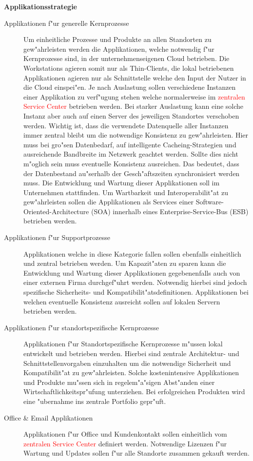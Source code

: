 \textbf{Applikationsstrategie}\\

\begin{description}
	
	\item[Applikationen f"ur generelle Kernprozesse] Um einheitliche Prozesse und Produkte an allen Standorten zu gew"ahrleisten werden die Applikationen, welche notwendig f"ur Kernprozesse sind, in der unternehmenseigenen Cloud betrieben. Die Workstations agieren somit nur als Thin-Clients, die lokal betriebenen Applikationen agieren nur als Schnittstelle welche den Input der Nutzer in die Cloud einspei"en. Je nach Auslastung sollen verschiedene Instanzen einer Applikation zu verf"ugung stehen welche normalerweise im \textcolor{red}{zentralen Service Center} betrieben werden. Bei starker Auslastung kann eine solche Instanz aber auch auf einen Server des jeweiligen Standortes verschoben werden. Wichtig ist, dass die verwendete Datenquelle aller Instanzen immer zentral bleibt um die notwendige Konsistenz zu gew"ahrleisten. Hier muss bei gro"sen Datenbedarf, auf intelligente Cacheing-Strategien und ausreichende Bandbreite im Netzwerk geachtet werden. Sollte dies nicht m"oglich sein muss eventuelle Konsistenz ausreichen. Das bedeutet, dass der Datenbestand au"serhalb der Gesch"aftszeiten synchronisiert werden muss. Die Entwicklung und Wartung dieser Applikationen soll im Unternehmen stattfinden. Um Wartbarkeit und Interoperabilit"at zu gew"ahrleisten sollen die Applikationen als Services einer Software-Oriented-Architecture (SOA) innerhalb eines Enterprise-Service-Bus (ESB) betrieben werden.  
	
	\item[Applikationen f"ur Supportprozesse] Applikationen welche in diese Kategorie fallen sollen ebenfalls einheitlich und zentral betrieben werden. Um Kapazit"aten zu sparen kann die Entwicklung und Wartung dieser Applikationen gegebenenfalls auch von einer externen Firma durchgef"uhrt werden. Notwendig hierbei sind jedoch spezifische Sicherheits- und Kompatibilit"atsdefinitionen. Applikationen bei welchen eventuelle Konsistenz ausreicht sollen auf lokalen Servern betrieben werden. 
	
	\item[Applikationen f"ur standortspezifische Kernprozesse] Applikationen f"ur Standortspezifische Kernprozesse m"ussen lokal entwickelt und betrieben werden. Hierbei sind zentrale Architektur- und Schnittstellenvorgaben einzuhalten um die notwendige Sicherheit und Kompatibilit"at zu gew"ahrleisten. Solche kostenintensive Applikationen und Produkte mu"ssen sich in regelem"a"sigen Abst"anden einer Wirtschaftlichkeitspr"ufung unterziehen. Bei erfolgreichen Produkten wird eine "ubernahme ins zentrale Portfolio gepr"uft. 

	\item[Office \& Email Applikationen] Applikationen f"ur Office und Kundenkontakt sollen einheitlich vom \textcolor{red}{zentralen Service Center} definiert werden. Notwendige Lizenzen f"ur Wartung und Updates sollen f"ur alle Standorte zusammen gekauft werden.

\end{description}

